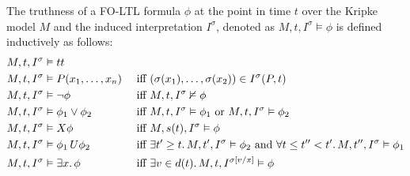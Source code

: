 \begin{definition}
  The truthness of a FO-LTL formula $\phi$ at the point in time $t$ over the Kripke model $M$ and the induced
  interpretation $I^\sigma$, denoted as $M, t, I^\sigma \vDash \phi$ is defined inductively as follows:
  \begin{align*}
    M, t, I^\sigma &\vDash tt && \\
    M, t, I^\sigma &\vDash P(x_1, \ldots, x_n) &&\text{ iff } (\sigma(x_1), \ldots, \sigma(x_2)) \in I^\sigma(P, t) \\
    M, t, I^\sigma &\vDash \neg\phi &&\text{ iff } M, t, I^\sigma \nvDash \phi \\
    M, t, I^\sigma &\vDash \phi_1 \lor \phi_2 &&\text{ iff } M, t, I^\sigma \vDash \phi_1 \text{ or } M, t, I^\sigma
      \vDash \phi_2 \\
    M, t, I^\sigma &\vDash X{\phi} &&\text{ iff } M, s(t), I^\sigma \vDash \phi \\
    M, t, I^\sigma &\vDash {\phi_1}\,U {\phi_2} &&\text{ iff } \exists t' \geq t \ldotp M, t', I^\sigma \vDash \phi_2
      \text{ and } \forall t \leq t'' < t' \ldotp M, t'', I^\sigma \vDash \phi_1 \\
    M, t, I^\sigma &\vDash \exists {x} \ldotp {\phi} &&\text{ iff } \exists {v \in d(t)} \ldotp {M, t, I^{\sigma[v/x]} \vDash \phi} \\
  \end{align*}
\end{definition}


